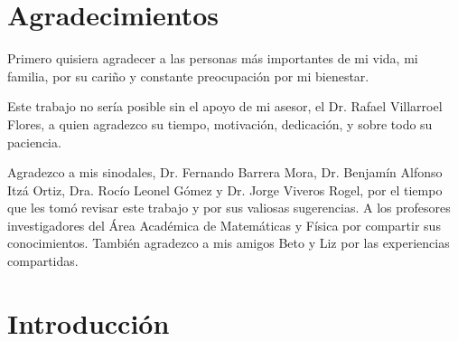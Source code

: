 \documentclass[12pt]{book}
\theoremstyle{definition}
\newcounter{in}
\begin{document}

\chapter*{Agradecimientos}

Primero quisiera agradecer a las personas más importantes de mi vida,
mi familia, por su cariño y constante preocupación por mi bienestar.

Este trabajo no sería posible sin el apoyo de mi asesor, el
Dr. Rafael Villarroel Flores, a quien agradezco su
tiempo, motivación, dedicación, y sobre todo su paciencia.

Agradezco a mis sinodales, Dr. Fernando Barrera Mora, Dr. Benjamín
Alfonso Itzá Ortiz, Dra. Rocío Leonel Gómez y Dr. Jorge Viveros Rogel,
por el tiempo que les tomó revisar este trabajo y por sus valiosas
sugerencias. A los profesores investigadores del Área Académica de
Matemáticas y Física por compartir sus conocimientos. También
agradezco a mis amigos Beto y Liz por las experiencias compartidas.

\tableofcontents

\newpage \thispagestyle{empty}

\chapter*{Introducción}
\end{document}
